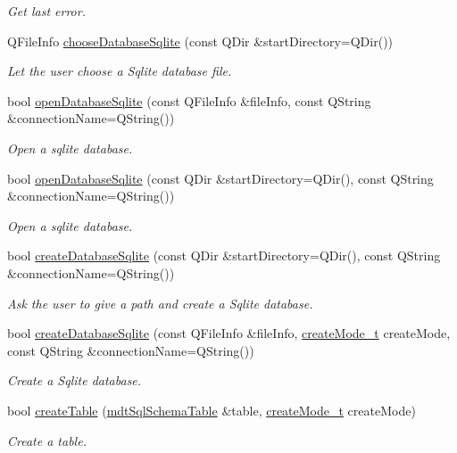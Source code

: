 \begin{DoxyCompactItemize}
\begin{DoxyCompactList}\small\item\em Get last error. \end{DoxyCompactList}\item 
QFileInfo \hyperlink{classmdt_sql_database_manager_ae6459276d25c6d3733b284249c1f1ab4}{chooseDatabaseSqlite} (const QDir \&startDirectory=QDir())
\begin{DoxyCompactList}\small\item\em Let the user choose a Sqlite database file. \end{DoxyCompactList}\item 
bool \hyperlink{classmdt_sql_database_manager_a336b722f66e13c5c9b09575642f7b273}{openDatabaseSqlite} (const QFileInfo \&fileInfo, const QString \&connectionName=QString())
\begin{DoxyCompactList}\small\item\em Open a sqlite database. \end{DoxyCompactList}\item 
bool \hyperlink{classmdt_sql_database_manager_a536f140060edf7721d8f0589f4d7de0d}{openDatabaseSqlite} (const QDir \&startDirectory=QDir(), const QString \&connectionName=QString())
\begin{DoxyCompactList}\small\item\em Open a sqlite database. \end{DoxyCompactList}\item 
bool \hyperlink{classmdt_sql_database_manager_ac9c9cac0342cc3a66e4c3510da8f97c9}{createDatabaseSqlite} (const QDir \&startDirectory=QDir(), const QString \&connectionName=QString())
\begin{DoxyCompactList}\small\item\em Ask the user to give a path and create a Sqlite database. \end{DoxyCompactList}\item 
bool \hyperlink{classmdt_sql_database_manager_ae2c4622505d90610d3990dd682662678}{createDatabaseSqlite} (const QFileInfo \&fileInfo, \hyperlink{classmdt_sql_database_manager_a2f5b46d67a88095053a5edfc415c7418}{createMode\_\-t} createMode, const QString \&connectionName=QString())
\begin{DoxyCompactList}\small\item\em Create a Sqlite database. \end{DoxyCompactList}\item 
bool \hyperlink{classmdt_sql_database_manager_afe78562023f6b8d530a24a9362587ed5}{createTable} (\hyperlink{classmdt_sql_schema_table}{mdtSqlSchemaTable} \&table, \hyperlink{classmdt_sql_database_manager_a2f5b46d67a88095053a5edfc415c7418}{createMode\_\-t} createMode)
\begin{DoxyCompactList}\small\item\em Create a table. \end{DoxyCompactList}\end{DoxyCompactItemize}


